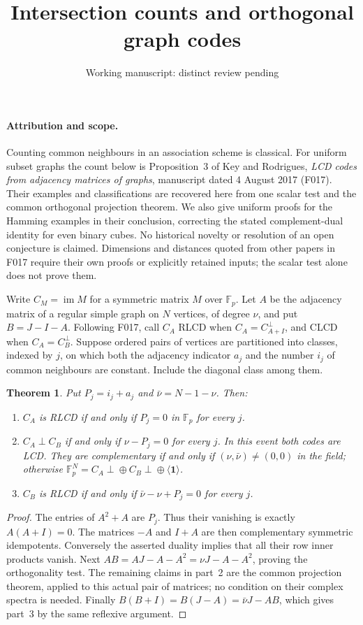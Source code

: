 \documentclass[11pt]{article}
\title{Intersection counts and orthogonal graph codes}
\author{Working manuscript: distinct review pending}
\date{}
\newtheorem{theorem}{Theorem}
\newcommand{\im}{\operatorname{im}}
\begin{document}
\maketitle

\paragraph{Attribution and scope.}
Counting common neighbours in an association scheme is classical. For
uniform subset graphs the count below is Proposition~3 of Key and Rodrigues,
\emph{LCD codes from adjacency matrices of graphs}, manuscript dated
4 August 2017 (F017). Their examples and classifications are recovered here
from one scalar test and the common orthogonal projection theorem. We also
give uniform proofs for the Hamming examples in their conclusion, correcting
the stated complement-dual identity for even binary cubes. No historical
novelty or resolution of an open conjecture is claimed. Dimensions and
distances quoted from other papers in F017 require their own proofs or
explicitly retained inputs; the scalar test alone does not prove them.

Write $C_M=\im M$ for a symmetric matrix $M$ over $\mathbb F_p$. Let $A$
be the adjacency matrix of a regular simple graph on $N$ vertices, of degree
$\nu$, and put $B=J-I-A$. Following F017, call $C_A$ RLCD when
$C_A=C_{A+I}^{\perp}$, and CLCD when $C_A=C_B^{\perp}$.
Suppose ordered pairs of vertices are partitioned into classes, indexed
by $j$, on which both the adjacency indicator $a_j$ and the number $i_j$
of common neighbours are constant. Include the diagonal class among them.

\begin{theorem}\label{thm:test}
Put $P_j=i_j+a_j$ and $\bar\nu=N-1-\nu$. Then:
\begin{enumerate}
\item $C_A$ is RLCD if and only if $P_j=0$ in $\mathbb F_p$ for every $j$.
\item $C_A\perp C_B$ if and only if $\nu-P_j=0$ for every $j$.
In this event both codes are LCD. They are complementary if and only if
$(\nu,\bar\nu)\ne(0,0)$ in the field; otherwise
$\mathbb F_p^N=C_A\perp\!\oplus C_B\perp\!\oplus\langle\mathbf1\rangle$.
\item $C_B$ is RLCD if and only if $\bar\nu-\nu+P_j=0$ for every $j$.
\end{enumerate}
\end{theorem}
\begin{proof}
The entries of $A^2+A$ are $P_j$. Thus their vanishing is exactly
$A(A+I)=0$. The matrices $-A$ and $I+A$ are then complementary symmetric
idempotents. Conversely the asserted duality implies that all their row
inner products vanish. Next
$AB=AJ-A-A^2=\nu J-A-A^2$, proving the orthogonality test.
The remaining claims in part~2 are the common projection theorem, applied
to this actual pair of matrices; no condition on their complex spectra is
needed. Finally $B(B+I)=B(J-A)=\bar\nu J-AB$, which gives part~3 by the
same reflexive argument.
\end{proof}
\end{document}
